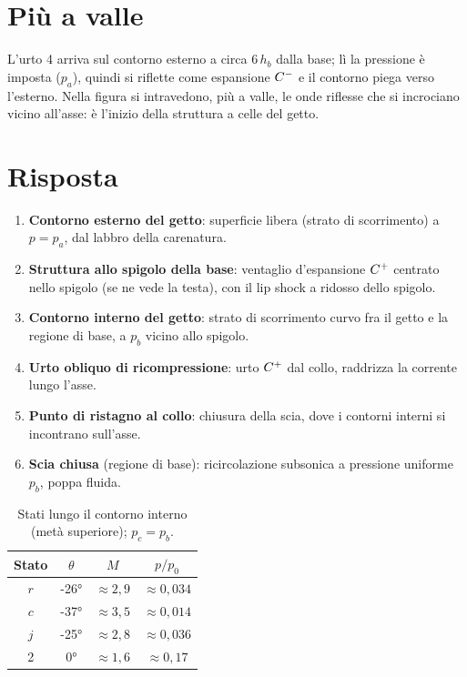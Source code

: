 \section*{Più a valle}
L'urto 4 arriva sul contorno esterno a circa $6\,h_b$ dalla base; lì la pressione è imposta ($p_a$), quindi si
riflette come espansione $C^{-}$ e il contorno piega verso l'esterno. Nella figura si intravedono, più a valle, le onde
riflesse che si incrociano vicino all'asse: è l'inizio della struttura a celle del getto.

\section*{Risposta}
\begin{enumerate}
\item \textbf{Contorno esterno del getto}: superficie libera (strato di scorrimento) a $p=p_a$, dal labbro della
  carenatura.
\item \textbf{Struttura allo spigolo della base}: ventaglio d'espansione $C^{+}$ centrato nello spigolo (se ne vede la
  testa), con il lip shock a ridosso dello spigolo.
\item \textbf{Contorno interno del getto}: strato di scorrimento curvo fra il getto e la regione di base, a $p_b$
  vicino allo spigolo.
\item \textbf{Urto obliquo di ricompressione}: urto $C^{+}$ dal collo, raddrizza la corrente lungo l'asse.
\item \textbf{Punto di ristagno al collo}: chiusura della scia, dove i contorni interni si incontrano sull'asse.
\item \textbf{Scia chiusa} (regione di base): ricircolazione subsonica a pressione uniforme $p_b$, poppa fluida.
\end{enumerate}

\begin{table}[H]
  \centering
  \begin{tabular}{cccc}
    \toprule
    Stato & $\theta$ & $M$ & $p/p_0$ \\
    \midrule
    $r$ & \ang{-26} & $\approx2{,}9$ & $\approx0{,}034$ \\
    $c$ & \ang{-37} & $\approx3{,}5$ & $\approx0{,}014$ \\
    $j$ & \ang{-25} & $\approx2{,}8$ & $\approx0{,}036$ \\
    2 & \ang{0} & $\approx1{,}6$ & $\approx0{,}17$ \\
    \bottomrule
  \end{tabular}
  \caption{Stati lungo il contorno interno (metà superiore); $p_c=p_b$.}
\end{table}

